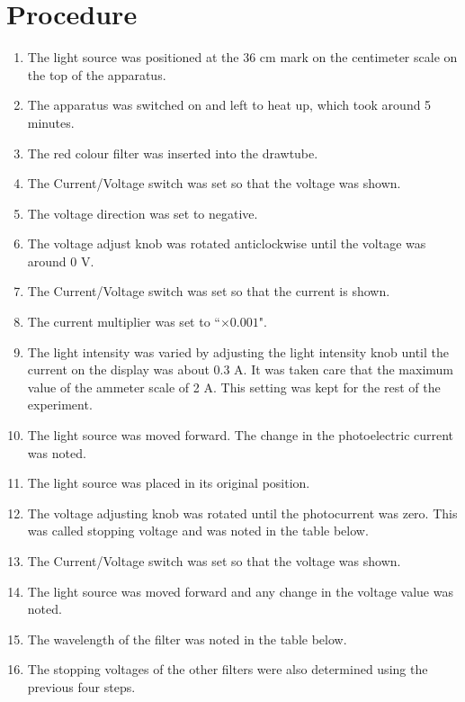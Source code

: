 \documentclass[12pt, a4paper]{article}
\begin{document}
\section*{Procedure}
\begin{enumerate}
    \item The light source was positioned at the 36 cm mark on the centimeter scale on the top of the apparatus.
    \item The apparatus was switched on and left to heat up, which took around 5 minutes.
    \item The red colour filter was inserted into the drawtube.
    \item The Current/Voltage switch was set so that the voltage was shown. 
    \item The voltage direction was set to negative.
    \item The voltage adjust knob was rotated anticlockwise until the voltage was around 0 V.
    \item The Current/Voltage switch was set so that the current is shown.
    \item The current multiplier was set to ``$\times0.001$".
    \item The light intensity was varied by adjusting the light intensity knob until the current on the display was about 0.3 \textmu A. It was taken care that the maximum value of the ammeter scale of 2 \textmu A. This setting was kept for the rest of the experiment.
    \item The light source was moved forward. The change in the photoelectric current was noted.
    \item The light source was placed in its original position.
    \item The voltage adjusting knob was rotated until the photocurrent was zero. This was called stopping voltage and was noted in the table below.
    \item The Current/Voltage switch was set so that the voltage was shown. 
    \item The light source was moved forward and any change in the voltage value was noted.
    \item The wavelength of the filter was noted in the table below.
    \item The stopping voltages of the other filters were also determined using the previous four steps.
\end{enumerate}
\end{document}
